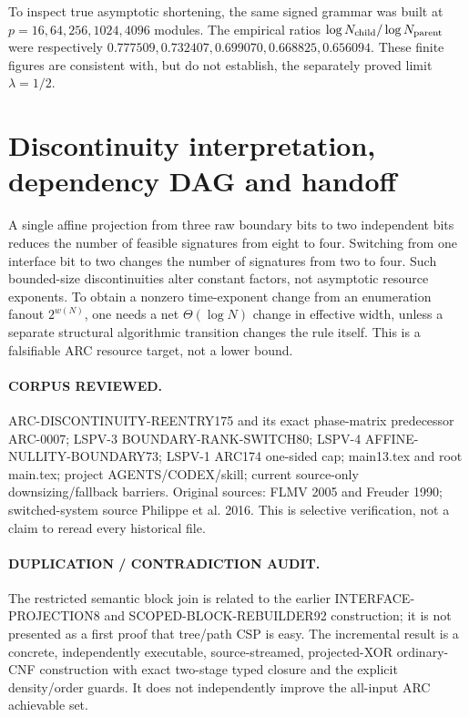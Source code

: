 \documentclass[11pt]{article}
\begin{document}
To inspect true asymptotic shortening, the same signed grammar was built
at $p=16,64,256,1024,4096$ modules. The empirical ratios
$\log N_{\rm child}/\log N_{\rm parent}$ were respectively
$0.777509, 0.732407, 0.699070, 0.668825, 0.656094$.
These finite figures are consistent with, but do not establish, the
separately proved limit $\lambda=1/2$.

\section{Discontinuity interpretation, dependency DAG and handoff}
A single affine projection from three raw boundary bits to two
independent bits reduces the number of feasible signatures from eight
to four. Switching from one interface bit to two changes the number
of signatures from two to four. Such bounded-size discontinuities
alter constant factors, not asymptotic resource exponents. To obtain a
nonzero time-exponent change from an enumeration fanout $2^{w(N)}$,
one needs a net $\Theta(\log N)$ change in effective width, unless a
separate structural algorithmic transition changes the rule itself.
This is a falsifiable ARC resource target, not a lower bound.

\paragraph{CORPUS REVIEWED.}
ARC-DISCONTINUITY-REENTRY175 and its exact phase-matrix predecessor
ARC-0007; LSPV-3 BOUNDARY-RANK-SWITCH80; LSPV-4
AFFINE-NULLITY-BOUNDARY73; LSPV-1 ARC174 one-sided cap;
main13.tex and root main.tex; project AGENTS/CODEX/skill;
current source-only downsizing/fallback barriers. Original sources:
FLMV 2005 and Freuder 1990; switched-system source Philippe et al. 2016.
This is selective verification, not a claim to reread every historical file.

\paragraph{DUPLICATION / CONTRADICTION AUDIT.}
The restricted semantic block join is related to the earlier
INTERFACE-PROJECTION8 and SCOPED-BLOCK-REBUILDER92 construction;
it is not presented as a first proof that tree/path CSP is easy.
The incremental result is a concrete, independently executable,
source-streamed, projected-XOR ordinary-CNF construction with
exact two-stage typed closure and the explicit density/order guards.
It does not independently improve the all-input ARC achievable set.
\end{document}
